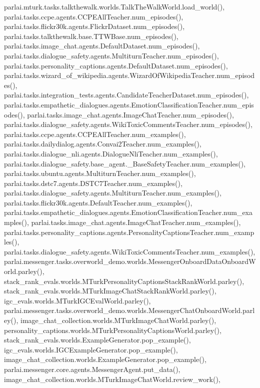 parlai.\+mturk.\+tasks.\+talkthewalk.\+worlds.\+Talk\+The\+Walk\+World.\+load\+\_\+world(), parlai.\+tasks.\+ccpe.\+agents.\+C\+C\+P\+E\+All\+Teacher.\+num\+\_\+episodes(), parlai.\+tasks.\+flickr30k.\+agents.\+Flickr\+Dataset.\+num\+\_\+episodes(), parlai.\+tasks.\+talkthewalk.\+base.\+T\+T\+W\+Base.\+num\+\_\+episodes(), parlai.\+tasks.\+image\+\_\+chat.\+agents.\+Default\+Dataset.\+num\+\_\+episodes(), parlai.\+tasks.\+dialogue\+\_\+safety.\+agents.\+Multiturn\+Teacher.\+num\+\_\+episodes(), parlai.\+tasks.\+personality\+\_\+captions.\+agents.\+Default\+Dataset.\+num\+\_\+episodes(), parlai.\+tasks.\+wizard\+\_\+of\+\_\+wikipedia.\+agents.\+Wizard\+Of\+Wikipedia\+Teacher.\+num\+\_\+episodes(), parlai.\+tasks.\+integration\+\_\+tests.\+agents.\+Candidate\+Teacher\+Dataset.\+num\+\_\+episodes(), parlai.\+tasks.\+empathetic\+\_\+dialogues.\+agents.\+Emotion\+Classification\+Teacher.\+num\+\_\+episodes(), parlai.\+tasks.\+image\+\_\+chat.\+agents.\+Image\+Chat\+Teacher.\+num\+\_\+episodes(), parlai.\+tasks.\+dialogue\+\_\+safety.\+agents.\+Wiki\+Toxic\+Comments\+Teacher.\+num\+\_\+episodes(), parlai.\+tasks.\+ccpe.\+agents.\+C\+C\+P\+E\+All\+Teacher.\+num\+\_\+examples(), parlai.\+tasks.\+dailydialog.\+agents.\+Convai2\+Teacher.\+num\+\_\+examples(), parlai.\+tasks.\+dialogue\+\_\+nli.\+agents.\+Dialogue\+Nli\+Teacher.\+num\+\_\+examples(), parlai.\+tasks.\+dialogue\+\_\+safety.\+base\+\_\+agent.\+\_\+\+Base\+Safety\+Teacher.\+num\+\_\+examples(), parlai.\+tasks.\+ubuntu.\+agents.\+Multiturn\+Teacher.\+num\+\_\+examples(), parlai.\+tasks.\+dstc7.\+agents.\+D\+S\+T\+C7\+Teacher.\+num\+\_\+examples(), parlai.\+tasks.\+dialogue\+\_\+safety.\+agents.\+Multiturn\+Teacher.\+num\+\_\+examples(), parlai.\+tasks.\+flickr30k.\+agents.\+Default\+Teacher.\+num\+\_\+examples(), parlai.\+tasks.\+empathetic\+\_\+dialogues.\+agents.\+Emotion\+Classification\+Teacher.\+num\+\_\+examples(), parlai.\+tasks.\+image\+\_\+chat.\+agents.\+Image\+Chat\+Teacher.\+num\+\_\+examples(), parlai.\+tasks.\+personality\+\_\+captions.\+agents.\+Personality\+Captions\+Teacher.\+num\+\_\+examples(), parlai.\+tasks.\+dialogue\+\_\+safety.\+agents.\+Wiki\+Toxic\+Comments\+Teacher.\+num\+\_\+examples(), parlai.\+messenger.\+tasks.\+overworld\+\_\+demo.\+worlds.\+Messenger\+Onboard\+Data\+Onboard\+World.\+parley(), stack\+\_\+rank\+\_\+evals.\+worlds.\+M\+Turk\+Personality\+Captions\+Stack\+Rank\+World.\+parley(), stack\+\_\+rank\+\_\+evals.\+worlds.\+M\+Turk\+Image\+Chat\+Stack\+Rank\+World.\+parley(), igc\+\_\+evals.\+worlds.\+M\+Turk\+I\+G\+C\+Eval\+World.\+parley(), parlai.\+messenger.\+tasks.\+overworld\+\_\+demo.\+worlds.\+Messenger\+Chat\+Onboard\+World.\+parley(), image\+\_\+chat\+\_\+collection.\+worlds.\+M\+Turk\+Image\+Chat\+World.\+parley(), personality\+\_\+captions.\+worlds.\+M\+Turk\+Personality\+Captions\+World.\+parley(), stack\+\_\+rank\+\_\+evals.\+worlds.\+Example\+Generator.\+pop\+\_\+example(), igc\+\_\+evals.\+worlds.\+I\+G\+C\+Example\+Generator.\+pop\+\_\+example(), image\+\_\+chat\+\_\+collection.\+worlds.\+Example\+Generator.\+pop\+\_\+example(), parlai.\+messenger.\+core.\+agents.\+Messenger\+Agent.\+put\+\_\+data(), image\+\_\+chat\+\_\+collection.\+worlds.\+M\+Turk\+Image\+Chat\+World.\+review\+\_\+work(), 